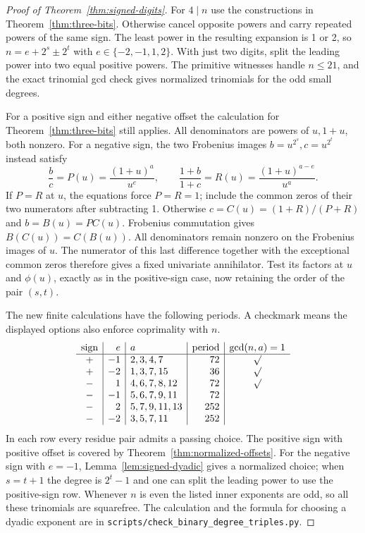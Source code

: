 \documentclass[11pt]{article}
\begin{document}
\begin{proof}[Proof of Theorem~\ref{thm:signed-digits}]
For \(4\mid n\) use the constructions in Theorem~\ref{thm:three-bits}.
Otherwise cancel opposite powers and carry repeated powers of the
same sign. The least power in the resulting expansion is 1 or 2, so
\(n=e+2^s\pm2^t\) with \(e\in\{-2,-1,1,2\}\). With just two
digits, split the leading power into two equal positive powers.
The primitive witnesses handle \(n\le21\), and the exact trinomial
gcd check gives normalized trinomials for the odd small degrees.

For a positive sign and either negative offset the calculation for
Theorem~\ref{thm:three-bits} still applies. All denominators are
powers of \(u,1+u\), both nonzero. For a negative sign, the two
Frobenius images \(b=u^{2^s},c=u^{2^t}\) instead satisfy
\[
 \frac{b}{c}=P(u)=\frac{(1+u)^a}{u^e},\qquad
 \frac{1+b}{1+c}=R(u)=\frac{(1+u)^{a-e}}{u^a}.
\]
If \(P=R\) at \(u\), the equations force \(P=R=1\); include the
common zeros of their two numerators after subtracting 1.
Otherwise \(c=C(u)=(1+R)/(P+R)\) and \(b=B(u)=P C(u)\).
Frobenius commutation gives \(B(C(u))=C(B(u))\). All denominators
remain nonzero on the Frobenius images of \(u\). The numerator of
this last difference together with the exceptional common zeros
therefore gives a fixed univariate annihilator. Test its factors at
\(u\) and \(\phi(u)\), exactly as in the positive-sign case, now
retaining the order of the pair \((s,t)\).

The new finite calculations have the following periods. A checkmark
means the displayed options also enforce coprimality with \(n\).
\[
\begin{array}{c|r|l|r|c}
 \text{sign}& e&a&\text{period}&\gcd(n,a)=1\\ \hline
 +&-1&2,3,4,7&72&\surd\\
 +&-2&1,3,7,15&36&\surd\\
 -&1&4,6,7,8,12&72&\surd\\
 -&-1&5,6,7,9,11&72&\\
 -&2&5,7,9,11,13&252&\\
 -&-2&3,5,7,11&252&
\end{array}
\]
In each row every residue pair admits a passing choice.
The positive sign with positive offset is covered by
Theorem~\ref{thm:normalized-offsets}. For the negative sign with
\(e=-1\), Lemma~\ref{lem:signed-dyadic} gives a normalized choice;
when \(s=t+1\) the degree is \(2^t-1\) and one can split the leading
power to use the positive-sign row. Whenever \(n\) is even the
listed inner exponents are odd, so all these trinomials are squarefree.
The calculation and the formula for choosing a dyadic exponent are in
\nolinkurl{scripts/check_binary_degree_triples.py}.
\end{proof}
\end{document}

